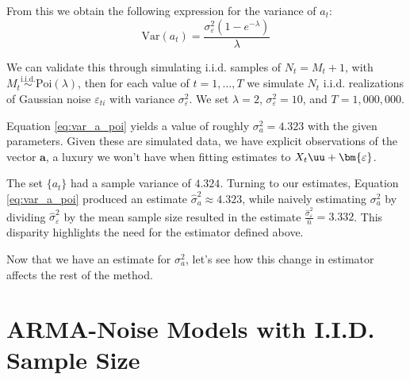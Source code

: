 From this we obtain the following expression for the variance of $a_t$:
\begin{equation}
    \label{eq:var_a_poi}
    \text{Var}(a_t) = \frac{\sigma_\varepsilon^2(1-e^{-\lambda})}{\lambda}
\end{equation}



We can validate this through simulating i.i.d. samples of $N_t = M_t + 1$, with  $M_t \overset{\text{i.i.d.}}{\sim}\text{Poi}(\lambda)$, then for each value of $t=1,...,T$ we simulate $N_t$ i.i.d. realizations of Gaussian noise $\varepsilon_{ti}$ with variance $\sigma_\varepsilon^2$. We set $\lambda = 2$, $\sigma_\varepsilon^2 = 10$,  and $T = 1,000,000$. 


Equation \ref{eq:var_a_poi} yields a value of roughly $\sigma_a^2 = 4.323$ with the given parameters.
Given these are simulated data, we have explicit observations of the vector $\mathbf{a}$, a luxury we won't have when fitting estimates to $X_t\uu + \bm{\varepsilon}$. 

The set $\{a_t\}$ had a sample variance of $4.324$. Turning to our estimates, Equation \ref{eq:var_a_poi} produced an estimate $\hat{\sigma}_a^2 \approx 4.323$, while naively estimating $\sigma_a^2$ by dividing $\hat{\sigma}_\varepsilon^2$ by the mean sample size resulted in the estimate $\frac{\hat{\sigma}_\varepsilon^2}{\bar{n}}=3.332$. This disparity highlights the need for the estimator defined above.





Now that we have an estimate for $\sigma_a^2$, let's see how this change in estimator affects the rest of the method.

\section{ARMA-Noise Models with I.I.D. Sample Size}


